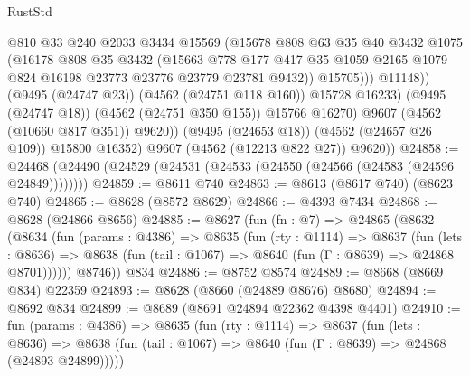 \begin{lexlean}{RustStd}
\begin{coremodule}
                          @810
                          @33
                          @240
                          @2033
                          @3434
                          @15569
                          (@15678
                            @808
                            @63
                            @35
                            @40
                            @3432
                            @1075
                            (@16178
                              @808
                              @35
                              @3432
                              (@15663
                                @778
                                @177
                                @417
                                @35
                                @1059
                                @2165
                                @1079
                                @824
                                @16198
                                @23773
                                @23776
                                @23779
                                @23781
                                @9432))
                            @15705)))
                      @11148))
                  (@9495 (@24747 @23))
                  (@4562 (@24751 @118 @160))
                  @15728
                  @16233)
                (@9495 (@24747 @18))
                (@4562 (@24751 @350 @155))
                @15766
                @16270)
              @9607
              (@4562 (@10660 @817 @351))
              @9620))
          (@9495 (@24653 @18))
          (@4562 (@24657 @26 @109))
          @15800
          @16352)
        @9607
        (@4562 (@12213 @822 @27))
        @9620))
@24858 := @24468 (@24490 (@24529 (@24531 (@24533 (@24550 (@24566 (@24583 (@24596 @24849))))))))
@24859 := @8611 @740
@24863 := @8613 (@8617 @740) (@8623 @740)
@24865 := @8628 (@8572 @8629)
@24866 := @4393 @7434
@24868 := @8628 (@24866 @8656)
@24885 := @8627
    (fun (fn : @7) =>
    @24865
      (@8632
        (@8634
          (fun (params : @4386) =>
          @8635
            (fun (rty : @1114) =>
            @8637
              (fun (lets : @8636) =>
              @8638 (fun (tail : @1067) => @8640 (fun (Γ : @8639) => @24868 @8701))))))
        @8746))
    @834
@24886 := @8752 @8574
@24889 := @8668 (@8669 @834) @22359
@24893 := @8628 (@8660 (@24889 @8676) @8680)
@24894 := @8692 @834
@24899 := @8689 (@8691 @24894 @22362 @4398 @4401)
@24910 := fun (params : @4386) =>
  @8635
    (fun (rty : @1114) =>
    @8637
      (fun (lets : @8636) =>
      @8638 (fun (tail : @1067) => @8640 (fun (Γ : @8639) => @24868 (@24893 @24899)))))

\end{coremodule}
\end{lexlean}
